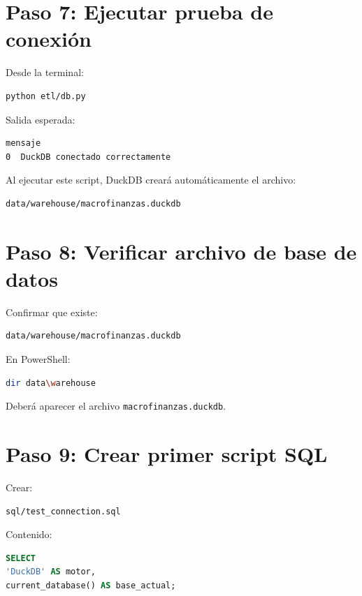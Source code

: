 \section{Paso 7: Ejecutar prueba de conexión}

Desde la terminal:

\begin{lstlisting}[language=bash]
python etl/db.py
\end{lstlisting}

Salida esperada:

\begin{verbatim}
mensaje
0  DuckDB conectado correctamente
\end{verbatim}

Al ejecutar este script, DuckDB creará automáticamente el archivo:

\begin{verbatim}
data/warehouse/macrofinanzas.duckdb
\end{verbatim}

\section{Paso 8: Verificar archivo de base de datos}

Confirmar que existe:

\begin{verbatim}
data/warehouse/macrofinanzas.duckdb
\end{verbatim}

En PowerShell:

\begin{lstlisting}[language=bash]
dir data\warehouse
\end{lstlisting}

Deberá aparecer el archivo \texttt{macrofinanzas.duckdb}.

\section{Paso 9: Crear primer script SQL}

Crear:

\begin{verbatim}
sql/test_connection.sql
\end{verbatim}

Contenido:

\begin{lstlisting}[language=SQL]
SELECT
'DuckDB' AS motor,
current_database() AS base_actual;
\end{lstlisting}

